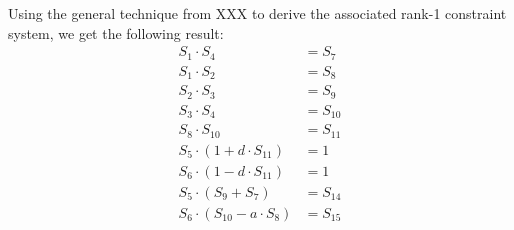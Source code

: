 Using the general technique from XXX to derive the associated rank-1 constraint system, we get the following result:
\begin{align*}
S_1 \cdot S_4 & = S_7 \\
S_1 \cdot S_2 & = S_8 \\
S_2 \cdot S_3 & = S_9 \\
S_3 \cdot S_4 & = S_{10} \\
S_8 \cdot S_{10} & = S_{11} \\
S_5 \cdot (1+ d\cdot S_{11}) & = 1 \\
S_6 \cdot (1 - d\cdot S_{11}) & = 1 \\
S_5 \cdot (S_9 + S_7) & = S_{14} \\
S_6 \cdot (S_{10} - a\cdot S_8) & = S_{15}
\end{align*}

